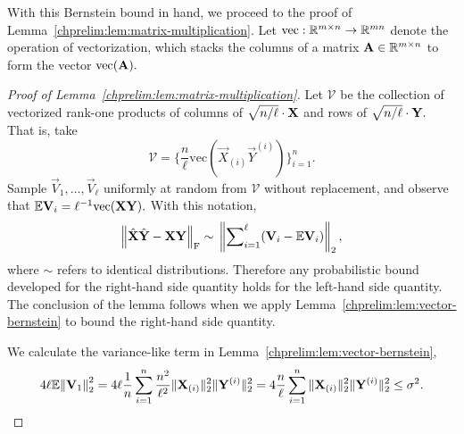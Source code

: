 With this Bernstein bound in hand, we proceed to the proof of 
Lemma~\ref{chprelim:lem:matrix-multiplication}. Let 
$\text{vec} : \mathbb{R}^{m \times n} \rightarrow \mathbb{R}^{mn}$ denote the operation of vectorization,
which stacks the columns of a matrix $\mathbf{A} \in \mathbb{R}^{m \times n}$ to form the vector $\text{vec}(\mathbf{A}).$

\begin{proof}[Proof of Lemma~\ref{chprelim:lem:matrix-multiplication}]
 Let $\mathcal{V}$ be the collection of vectorized rank-one products of 
 columns of $\sqrt{n/\ell}\cdot\mathbf{X}$ and rows of $\sqrt{n/\ell}\cdot\mathbf{Y}.$ That is, take
\[
 \mathcal{V} = \bigg\{ \frac{n}{\ell} \text{vec}(\vec{X}_{(i)} \vec{Y}^{(i)}) \bigg\}_{i=1}^n.
\]
Sample $\vec{V}_1, \ldots, \vec{V}_\ell$ uniformly at random from $\mathcal{V}$ 
without replacement, and observe that $\mathbb{E}{\mathbf{V}_i} = \ell^{-1} \text{vec}(\mathbf{X} \mathbf{Y}).$
With this notation, 
\[
 \left\|\hat{\mathbf{X}} \hat{\mathbf{Y}} - \mathbf{X} \mathbf{Y}\right\|_\mathrm{F} \sim \mbox{}\left\|\sum\nolimits_{i=1}^\ell (\mathbf{V}_i - \mathbb{E}{\mathbf{V}_i})\right\|_2,
\]
where $\sim$ refers to identical distributions. Therefore any probabilistic bound developed for the 
right-hand side quantity holds for the left-hand side quantity. The conclusion of the lemma follows 
when we apply Lemma~\ref{chprelim:lem:vector-bernstein} to bound the right-hand side quantity.

We calculate the variance-like term in Lemma~\ref{chprelim:lem:vector-bernstein},
\[
 4 \ell \mathbb{E}{\left\|\mathbf{V}_1\right\|_2^2} = 4\ell \frac{1}{n} \sum_{i=1}^n \frac{n^2}{\ell^2} 
 \|\mathbf{X}_{(i)}\|_2^2 \|\mathbf{Y}^{(i)}\|_2^2 = 4\frac{n}{\ell} \sum_{i=1}^n 
 \|\mathbf{X}_{(i)}\|_2^2 \|\mathbf{Y}^{(i)}\|_2^2 \leq \sigma^2.
\]


\end{proof}
